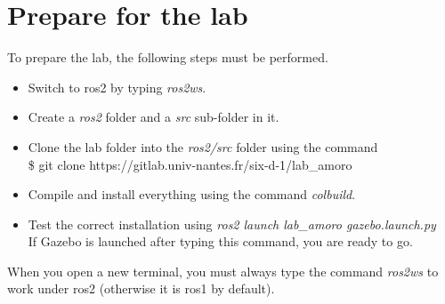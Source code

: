 \documentclass[a4paper]{article}
\begin{document}
\section{Prepare for the lab}
To prepare the lab, the following steps must be performed.
\begin{itemize}
	\item Switch to ros2 by typing \textit{ros2ws}.
    \item Create a \textit{ros2} folder and a \textit{src} sub-folder in it.
    \item Clone the lab folder into the \textit{ros2/src} folder using the command\\
        \$ git clone https://gitlab.univ-nantes.fr/six-d-1/lab\_amoro\\
    \item Compile and install everything using the command \textit{colbuild}.
    \item Test the correct installation using \textit{ros2 launch lab\_amoro gazebo.launch.py}\\
    If Gazebo is launched after typing this command, you are ready to go.
\end{itemize}
When you open a new terminal, you must always type the command \textit{ros2ws} to work under ros2 (otherwise it is ros1 by default).
\end{document}
